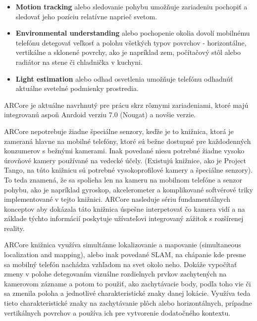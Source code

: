 \begin{itemize}
    \item \textbf{Motion tracking} alebo sledovanie pohybu umožňuje zariadeniu pochopiť a sledovať jeho pozíciu relatívne naprieč svetom.
    
    \item \textbf{Environmental understanding} alebo pochopenie okolia dovolí mobilnému telefónu detegovať veľkosť a polohu všetkých typov povrchov - horizontálne, vertikálne a sklonené povrchy, ako je napríklad zem, počítačový stôl alebo radiátor na stene či chladnička v kuchyni.
    
    \item \textbf{Light estimation} alebo odhad osvetlenia umožňuje telefónu odhadnúť aktuálne svetelné podmienky prostredia.
\end{itemize}


ARCore je aktuálne navrhnutý pre prácu skrz rôznymi zariadeniami, ktoré majú integrovanú aspoň Anrdoid verziu 7.0 (Nougat) a novšie verzie. \cite{google2024arcore}

ARCore nepotrebuje žiadne špeciálne senzory, keďže je to knižnica, ktorá je zameraná hlavne na mobilné telefóny, ktoré sú bežne dostupné pre každodenných konzumerov s bežnými kamerami. Inak povedané niesu potrebné žiadne vysoko úrovňové kamery používané na vedecké účely. (Existujú knižnice, ako je Project Tango, na túto knižnicu sú potrebné vysokoprofilové kamery a špeciálne senzory). To teda znamená, že sa spolieha len na kameru na mobilnom telefóne a senzor pohybu, ako je napríklad gyroskop, akcelerometer a komplikované softvérové triky implementované v tejto knižnici. ARCore nasleduje sériu fundamentálnych konceptov aby dokázala táto knižnica úspešne interpetovať čo kamera vidí a na základe týchto informácií poskytuje užívateľovi integrovaný zážitok s rozšírenej reality. \cite{conway2023arcore}

ARCore knižnica využíva  simultánne lokalizovanie a mapovanie (simultaneous localization and mapping), alebo inak povedané SLAM, na chápanie kde presne sa mobilný telefón nachádza vzhľadom na svet okolo neho. Dokáže vypočítať zmeny v polohe detegovaním vizuálne rozdielnych prvkov zachytených na kamerovom zázname a potom to použiť, ako zachytávacie body, podľa toho vie či sa zmenila poloha a jednotlivé charakteristické znaky danej lokácie. Využíva teda tieto charakteristické znaky na zachytávanie plôch alebo horizontálnych, prípadne vertikálnych povrchov a používa ich pre vytvorenie dodatočného kontextu. 

